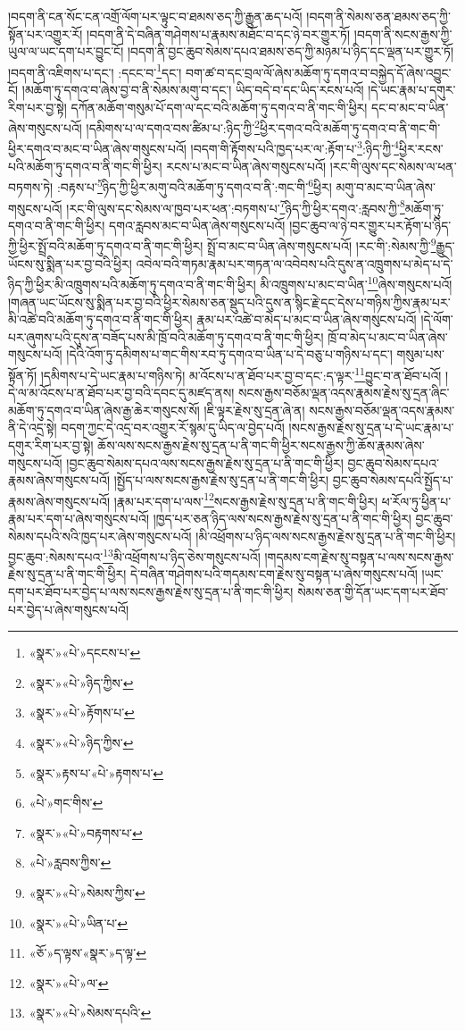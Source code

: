 །བདག་ནི་ངན་སོང་ངན་འགྲོ་ལོག་པར་ལྟུང་བ་ཐམས་ཅད་ཀྱི་རྒྱུན་ཆད་པའོ། །བདག་ནི་སེམས་ཅན་ཐམས་ཅད་ཀྱི་སྟོན་པར་འགྱུར་རོ། །བདག་ནི་དེ་བཞིན་གཤེགས་པ་རྣམས་མཐོང་བ་དང་ཉེ་བར་གྱུར་ཏོ། །བདག་ནི་སངས་རྒྱས་ཀྱི་ཡུལ་ལ་ཡང་དག་པར་བྱུང་ངོ། །བདག་ནི་བྱང་ཆུབ་སེམས་དཔའ་ཐམས་ཅད་ཀྱི་མཉམ་པ་ཉིད་དང་ལྡན་པར་གྱུར་ཏོ། །བདག་ནི་འཇིགས་པ་དང་། :དངང་བ་\footnote{«སྣར་»«པེ་»དངངས་པ་}དང་། བག་ཚ་བ་དང་བྲལ་ལོ་ཞེས་མཆོག་ཏུ་དགའ་བ་བསྐྱེད་དོ་ཞེས་འབྱུང་ངོ། །མཆོག་ཏུ་དགའ་བ་ཞེས་བྱ་བ་ནི་སེམས་མགུ་བ་དང་། ཡིད་བདེ་བ་དང་ཡིད་རངས་པའོ། །དེ་ཡང་རྣམ་པ་དགུར་རིག་པར་བྱ་སྟེ། དཀོན་མཆོག་གསུམ་པོ་དག་ལ་དང་བའི་མཆོག་ཏུ་དགའ་བ་ནི་གང་གི་ཕྱིར། དང་བ་མང་བ་ཡིན་ཞེས་གསུངས་པའོ། །དམིགས་པ་ལ་དགའ་བས་ཚིམ་པ་:ཉིད་ཀྱི་\footnote{«སྣར་»«པེ་»ཉིད་ཀྱིས་}ཕྱིར་དགའ་བའི་མཆོག་ཏུ་དགའ་བ་ནི་གང་གི་ཕྱིར་དགའ་བ་མང་བ་ཡིན་ཞེས་གསུངས་པའོ། །བདག་གི་རྟོགས་པའི་ཁྱད་པར་ལ་:རྟོག་པ་\footnote{«སྣར་»«པེ་»རྟོགས་པ་}:ཉིད་ཀྱི་\footnote{«སྣར་»«པེ་»ཉིད་ཀྱིས་}ཕྱིར་རངས་པའི་མཆོག་ཏུ་དགའ་བ་ནི་གང་གི་ཕྱིར། རངས་པ་མང་བ་ཡིན་ཞེས་གསུངས་པའོ། །རང་གི་ལུས་དང་སེམས་ལ་ཕན་བཏགས་ཏེ། :བརྟས་པ་\footnote{«སྣར་»རྟས་པ་«པེ་»རྟགས་པ་}ཉིད་ཀྱི་ཕྱིར་མགུ་བའི་མཆོག་ཏུ་དགའ་བ་ནི་:གང་གི་\footnote{«པེ་»གང་གིས་}ཕྱིར། མགུ་བ་མང་བ་ཡིན་ཞེས་གསུངས་པའོ། །རང་གི་ལུས་དང་སེམས་ལ་ཁྱབ་པར་ཕན་:བཏགས་པ་\footnote{«སྣར་»«པེ་»བརྟགས་པ་}ཉིད་ཀྱི་ཕྱིར་དགའ་:རླབས་ཀྱི་\footnote{«པེ་»རླབས་ཀྱིས་}མཆོག་ཏུ་དགའ་བ་ནི་གང་གི་ཕྱིར། དགའ་རླབས་མང་བ་ཡིན་ཞེས་གསུངས་པའོ། །བྱང་ཆུབ་ལ་ཉེ་བར་གྱུར་པར་རྟོག་པ་ཉིད་ཀྱི་ཕྱིར་སྤྲོ་བའི་མཆོག་ཏུ་དགའ་བ་ནི་གང་གི་ཕྱིར། སྤྲོ་བ་མང་བ་ཡིན་ཞེས་གསུངས་པའོ། །རང་གི་:སེམས་ཀྱི་\footnote{«སྣར་»«པེ་»སེམས་ཀྱིས་}རྒྱུད་ཡོངས་སུ་སྨིན་པར་བྱ་བའི་ཕྱིར། འབེལ་བའི་གཏམ་རྣམ་པར་གཏན་ལ་འབེབས་པའི་དུས་ན་འཁྲུགས་པ་མེད་པ་དེ་ཉིད་ཀྱི་ཕྱིར་མི་འཁྲུགས་པའི་མཆོག་ཏུ་དགའ་བ་ནི་གང་གི་ཕྱིར། མི་འཁྲུགས་པ་མང་བ་ཡིན་\footnote{«སྣར་»«པེ་»ཡིན་པ་}ཞེས་གསུངས་པའོ། །གཞན་ཡང་ཡོངས་སུ་སྨིན་པར་བྱ་བའི་ཕྱིར་སེམས་ཅན་སྡུད་པའི་དུས་ན་སྙིང་རྗེ་དང་དེས་པ་གཉིས་ཀྱིས་རྣམ་པར་མི་འཚེ་བའི་མཆོག་ཏུ་དགའ་བ་ནི་གང་གི་ཕྱིར། རྣམ་པར་འཚེ་བ་མེད་པ་མང་བ་ཡིན་ཞེས་གསུངས་པའོ། །དེ་ལོག་པར་ཞུགས་པའི་དུས་ན་བཟོད་པས་མི་ཁྲོ་བའི་མཆོག་ཏུ་དགའ་བ་ནི་གང་གི་ཕྱིར། ཁྲོ་བ་མེད་པ་མང་བ་ཡིན་ཞེས་གསུངས་པའོ། །དེའི་འོག་ཏུ་དམིགས་པ་གང་གིས་རབ་ཏུ་དགའ་བ་ཡིན་པ་དེ་བཅུ་པ་གཉིས་པ་དང་། གསུམ་པས་སྟོན་ཏོ། །དམིགས་པ་དེ་ཡང་རྣམ་པ་གཉིས་ཏེ། མ་འོངས་པ་ན་ཐོབ་པར་བྱ་བ་དང་:ད་ལྟར་\footnote{«ཅོ་»ད་ལྟས་«སྣར་»ད་ལྟ་}བྱུང་བ་ན་ཐོབ་པའོ། །དེ་ལ་མ་འོངས་པ་ན་ཐོབ་པར་བྱ་བའི་དབང་དུ་མཛད་ནས། སངས་རྒྱས་བཅོམ་ལྡན་འདས་རྣམས་རྗེས་སུ་དྲན་ཞིང་མཆོག་ཏུ་དགའ་བ་ཡིན་ཞེས་རྒྱ་ཆེར་གསུངས་སོ། །ཇི་ལྟར་རྗེས་སུ་དྲན་ཞེ་ན། སངས་རྒྱས་བཅོམ་ལྡན་འདས་རྣམས་ནི་དེ་འདྲ་སྟེ། བདག་ཀྱང་དེ་འདྲ་བར་འགྱུར་རོ་སྙམ་དུ་ཡིད་ལ་བྱེད་པའོ། །སངས་རྒྱས་རྗེས་སུ་དྲན་པ་དེ་ཡང་རྣམ་པ་དགུར་རིག་པར་བྱ་སྟེ། ཆོས་ལས་སངས་རྒྱས་རྗེས་སུ་དྲན་པ་ནི་གང་གི་ཕྱིར་སངས་རྒྱས་ཀྱི་ཆོས་རྣམས་ཞེས་གསུངས་པའོ། །བྱང་ཆུབ་སེམས་དཔའ་ལས་སངས་རྒྱས་རྗེས་སུ་དྲན་པ་ནི་གང་གི་ཕྱིར། བྱང་ཆུབ་སེམས་དཔའ་རྣམས་ཞེས་གསུངས་པའོ། །སྤྱོད་པ་ལས་སངས་རྒྱས་རྗེས་སུ་དྲན་པ་ནི་གང་གི་ཕྱིར། བྱང་ཆུབ་སེམས་དཔའི་སྤྱོད་པ་རྣམས་ཞེས་གསུངས་པའོ། །རྣམ་པར་དག་པ་ལས་\footnote{«སྣར་»«པེ་»ལ་}སངས་རྒྱས་རྗེས་སུ་དྲན་པ་ནི་གང་གི་ཕྱིར། ཕ་རོལ་ཏུ་ཕྱིན་པ་རྣམ་པར་དག་པ་ཞེས་གསུངས་པའོ། །ཁྱད་པར་ཅན་ཉིད་ལས་སངས་རྒྱས་རྗེས་སུ་དྲན་པ་ནི་གང་གི་ཕྱིར། བྱང་ཆུབ་སེམས་དཔའི་སའི་ཁྱད་པར་ཞེས་གསུངས་པའོ། །མི་འཕྲོགས་པ་ཉིད་ལས་སངས་རྒྱས་རྗེས་སུ་དྲན་པ་ནི་གང་གི་ཕྱིར། བྱང་ཆུབ་:སེམས་དཔའ་\footnote{«སྣར་»«པེ་»སེམས་དཔའི་}མི་འཕྲོགས་པ་ཉིད་ཅེས་གསུངས་པའོ། །གདམས་ངག་རྗེས་སུ་བསྟན་པ་ལས་སངས་རྒྱས་རྗེས་སུ་དྲན་པ་ནི་གང་གི་ཕྱིར། དེ་བཞིན་གཤེགས་པའི་གདམས་ངག་རྗེས་སུ་བསྟན་པ་ཞེས་གསུངས་པའོ། །ཡང་དག་པར་ཐོབ་པར་བྱེད་པ་ལས་སངས་རྒྱས་རྗེས་སུ་དྲན་པ་ནི་གང་གི་ཕྱིར། སེམས་ཅན་གྱི་དོན་ཡང་དག་པར་ཐོབ་པར་བྱེད་པ་ཞེས་གསུངས་པའོ། 